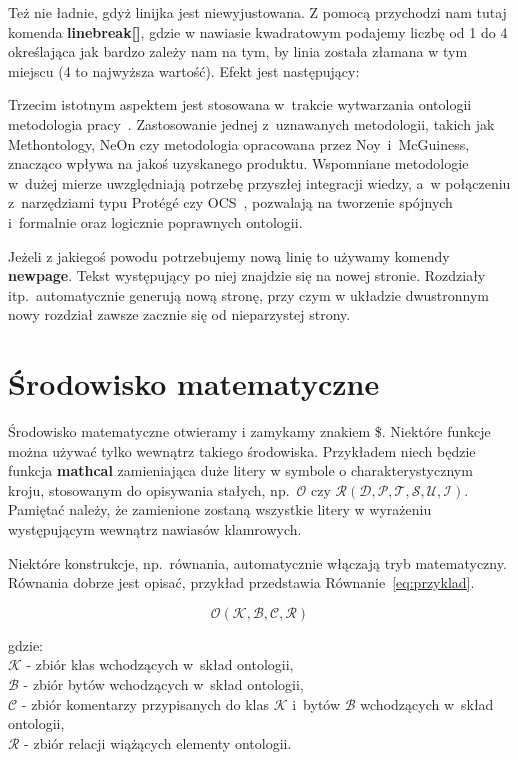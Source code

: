 Też nie ładnie, gdyż linijka jest niewyjustowana. Z pomocą przychodzi nam tutaj komenda \textbf{linebreak[]}, gdzie w nawiasie kwadratowym podajemy liczbę od 1 do 4 określająca jak bardzo zależy nam na tym, by linia została złamana w tym miejscu (4 to najwyższa wartość). Efekt jest następujący:

Trzecim istotnym aspektem jest stosowana w~trakcie wytwarzania ontologii metodologia \linebreak[4] pracy~\cite{boinski2012kaskbook,boinski2011security}. Zastosowanie jednej z~uznawanych metodologii, takich jak Methontology, NeOn czy metodologia opracowana przez Noy~i~McGuiness, znacząco wpływa na jakoś uzyskanego produktu. Wspomniane metodologie w~dużej mierze uwzględniają potrzebę przyszłej integracji wiedzy, a~w połączeniu z~narzędziami typu Protégé czy OCS~\cite{boinski2007kaskbook,boinski2009ocs,boinski2010zespolowa}, pozwalają na tworzenie spójnych i~formalnie oraz logicznie poprawnych ontologii.

Jeżeli z jakiegoś powodu potrzebujemy nową linię to używamy komendy \textbf{newpage}. \newpage Tekst występujący po niej znajdzie się na nowej stronie. Rozdziały itp.\ automatycznie generują nową stronę, przy czym w układzie dwustronnym nowy rozdział zawsze zacznie się od nieparzystej strony.

\section{Środowisko matematyczne}

Środowisko matematyczne otwieramy i zamykamy znakiem \$. Niektóre funkcje można używać tylko wewnątrz takiego środowiska. Przykładem niech będzie funkcja \textbf{mathcal} zamieniająca duże litery w symbole o charakterystycznym kroju, stosowanym do opisywania stałych, np.\ $\mathcal{O}$ czy $\mathcal{R(D,P,T,S,U,I)}$. Pamiętać należy, że zamienione zostaną wszystkie litery w wyrażeniu występującym wewnątrz nawiasów klamrowych.

Niektóre konstrukcje, np.\ równania, automatycznie włączają tryb matematyczny. Równania dobrze jest opisać, przykład przedstawia Równanie~\ref{eq:przyklad}.

\begin{equation}
  \mathcal{O(K,B,C,R)}
  \label{eq:przyklad}
\end{equation}

gdzie:\\
$\mathcal{K}$ - zbiór klas wchodzących w~skład ontologii,\\
$\mathcal{B}$ - zbiór bytów wchodzących w~skład ontologii,\\
$\mathcal{C}$ - zbiór komentarzy przypisanych do klas $\mathcal{K}$ i~bytów $\mathcal{B}$ wchodzących w~skład ontologii,\\
$\mathcal{R}$ - zbiór relacji wiążących elementy ontologii.


